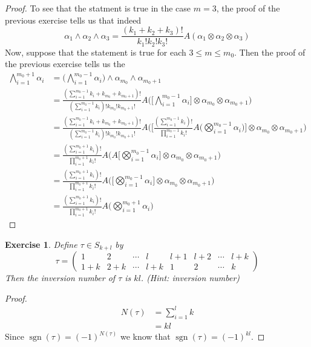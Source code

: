 \documentclass[12pt]{amsart}
\newtheorem{ex}[thm]{Exercise}
\newcommand{\al}{\alpha}
\DeclareMathOperator{\sgn}{sgn}
\begin{document}
	\begin{proof}
		To see that the statment is true in the case $m=3$, the proof of the previous exercise tells us that indeed $$\al_1 \wedge \al_2 \wedge \al_3 = \frac{(k_1 + k_2 + k_3)!}{k_1! k_2! k_3!}A(\al_1 \otimes \al_2 \otimes \al_3)$$
		Now, suppose that the statement is true for each $3 \leq m \leq m_0$. Then the proof of the previous exercise tells us the 
		\begin{align*}
			\bigwedge_{i=1}^{m_0 +1} \al_i
			&= \bigg( \bigwedge_{i=1}^{m_0 -1} \al_i \bigg) \wedge \al_{m_0} \wedge \al_{m_0+1} \\
			&= \frac{(\sum_{i=1}^{m_0-1} k_i + k_{m_0} + k_{m_0+1})! }{(\sum_{i=1}^{m_0-1} k_i)! k_{m_0}! k_{m_0+1}!} A\bigg( \bigg[ \bigwedge_{i=1}^{m_0-1} \al_i \bigg] \otimes \al_{m_0} \otimes \al_{m_0 +1}  \bigg) \\
			&= \frac{(\sum_{i=1}^{m_0-1} k_i + k_{m_0} + k_{m_0+1})! }{(\sum_{i=1}^{m_0-1} k_i)! k_{m_0}! k_{m_0+1}!} A\bigg( \bigg[ \frac{(\sum_{i=1}^{m_0-1} k_i)!}{\prod_{i=1}^{m_0-1} k_i!} A \bigg (\bigotimes_{i=1}^{m_0-1} \al_i \bigg) \bigg] \otimes \al_{m_0} \otimes \al_{m_0 +1}  \bigg) \\
			&= \frac{(\sum_{i=1}^{m_0+1} k_i)! }{ \prod_{i=1}^{m_0+1} k_i!}A \bigg( A\bigg [ \bigotimes_{i=1}^{m_0-1} \al_i \bigg] \otimes \al_{m_0} \otimes \al_{m_0 +1}  \bigg) \\
			&= \frac{(\sum_{i=1}^{m_0+1} k_i)! }{ \prod_{i=1}^{m_0+1} k_i!}A \bigg( \bigg [ \bigotimes_{i=1}^{m_0-1} \al_i \bigg] \otimes \al_{m_0} \otimes \al_{m_0 +1}  \bigg) \\
			&= \frac{(\sum_{i=1}^{m_0+1} k_i)! }{ \prod_{i=1}^{m_0+1} k_i!}A \bigg(  \bigotimes_{i=1}^{m_0+1} \al_i   \bigg) 
		\end{align*}
	\end{proof}
	
	\begin{ex}
		Define $\tau \in S_{k+l}$ by 
		\[\tau = 
		\begin{pmatrix}
			1 & 2 & \cdots &l &l+1 & l+2 & \cdots & l+k \\
			1+k & 2+ k & \cdots & l+k & 1 & 2 & \cdots & k 
		\end{pmatrix} 
		\]
		Then the inversion number of $\tau$ is $kl$.
		(Hint: inversion number)
	\end{ex}

	\begin{proof}
		\begin{align*}
			N(\tau) 
			&= \sum_{i = 1}^l k \\
			&= kl
		\end{align*}
		Since $\sgn (\tau) = (-1)^{N(\tau)}$ we know that  $\sgn(\tau) = (-1)^{kl}$.
	\end{proof}
\end{document}
